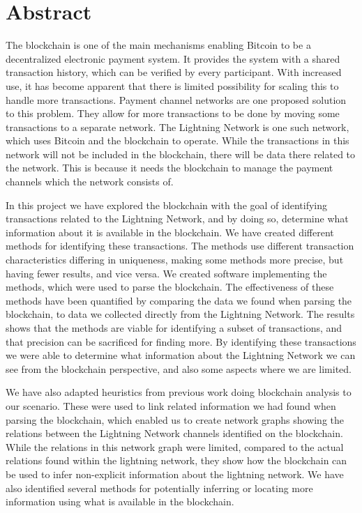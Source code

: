 \chapter*{Abstract}

The blockchain is one of the main mechanisms enabling Bitcoin to be a decentralized electronic payment system. It provides the system with a shared transaction history, which can be verified by every participant. With increased use, it  has become apparent that there is limited possibility for scaling this to handle more transactions. Payment channel networks are one proposed solution to this problem. They allow for more transactions to be done by moving some transactions to a separate network. The Lightning Network is one such network, which uses Bitcoin and the blockchain to operate. While the transactions in this network will not be included in the blockchain, there will be data there related to the network. This is because it needs the blockchain to manage the payment channels which the network consists of. 

In this project we have explored the blockchain with the goal of identifying transactions related to the Lightning Network, and by doing so, determine what information about it is available in the blockchain. We have created different methods for identifying these transactions. The methods use different transaction characteristics differing in uniqueness, making some methods more precise, but having fewer results, and vice versa. We created software implementing the methods, which 
were used to parse the blockchain. The effectiveness of these methods have been quantified by comparing the data we found when parsing the blockchain, to data we collected directly from the Lightning Network. The results shows that the methods are viable for identifying a subset of transactions, and that precision can be sacrificed for finding more.
By identifying these transactions we were able to determine what information about the Lightning Network we can see from the blockchain perspective, and also some aspects where we are limited. 

We have also adapted heuristics from previous work doing blockchain analysis to our scenario.
These were used to link related information we had found when parsing the blockchain, which enabled us to create network graphs showing the relations between the Lightning Network channels identified on the blockchain. While the relations in this network graph were limited, compared to the actual relations found within the lightning network, they show how the blockchain can be used to infer non-explicit information about the lightning network. We have also identified several methods for potentially inferring or locating more information using what is available in the blockchain.

